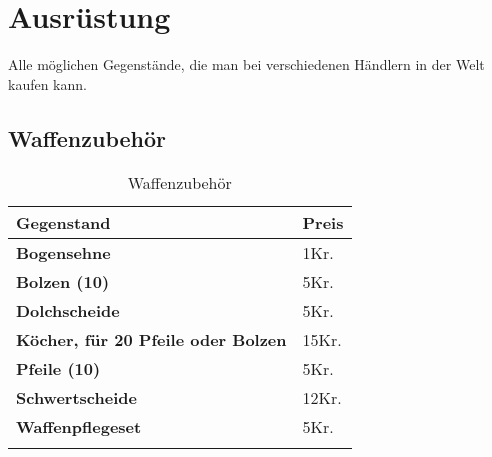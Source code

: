 {\let\clearpage\relax\chapter{Ausrüstung}}
Alle möglichen Gegenstände, die man bei verschiedenen Händlern in der Welt kaufen kann.

\section{Waffenzubehör} 
\begin{longtable}{|p{5cm}|p{2cm}|}
\hline
\textbf{Gegenstand} & \textbf{Preis} \\ \hline
\textbf{Bogensehne} & 1Kr. \\ \hline
\textbf{Bolzen (10)} & 5Kr. \\ \hline
\textbf{Dolchscheide} & 5Kr. \\ \hline
\textbf{Köcher, für 20 Pfeile oder Bolzen} & 15Kr. \\ \hline
\textbf{Pfeile (10)} & 5Kr. \\ \hline
\textbf{Schwertscheide} & 12Kr. \\ \hline
\textbf{Waffenpflegeset} & 5Kr. \\ \hline

\caption{Waffenzubehör}
\label{tab:Waffenzubehör}
\end{longtable}

